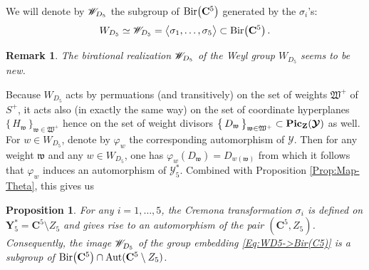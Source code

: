 \documentclass[11pt]{amsart}
\newtheorem{prop}[thm]{Proposition}
\newtheorem{rem}[thm]{Remark}
\begin{document}


We will denote by $\boldsymbol{\mathscr W}_{\hspace{-0.1cm}D_5}$ the subgroup of 
$ {\rm Bir}\big(  \mathbf C^5\big) $  generated by  the $\sigma_i$'s: 
\begin{equation}
\label{Eq:Bir-W-D5}
W_{D_5}\simeq \boldsymbol{\mathscr W}_{\hspace{-0.1cm}D_5}=\big\langle 
\sigma_1,\ldots,\sigma_5
\big\rangle  \subset {\rm Bir}\big(  \mathbf C^5\big) \, . 
\end{equation}%

\begin{rem}
The birational realization 
$\boldsymbol{\mathscr W}_{\hspace{-0.1cm}D_5}$
of the Weyl group $W_{D_5}$  seems to be new.
\end{rem}

Because $W_{D_5}$ acts by permuations (and transitively) on the set of weights $\mathfrak W^+$ of $S^+$, it acts also (in exactly the same way) on the set of coordinate hyperplanes $\big\{
\, H_{\mathfrak w}\, \big\}_{\mathfrak w \in \mathfrak W^+} $ hence on the set of weight divisors 
$\big\{
\, D_{\mathfrak w}\, \big\}_{\mathfrak w \in \mathfrak W^+} \subset {\bf Pic}_{\mathbf Z}(\boldsymbol{\mathcal Y})$ as well.  For $w\in W_{D_5}$, denote by $\varphi_w$ the corresponding automorphism of $\boldsymbol{\mathcal Y}$. Then for any weight $\mathfrak w$ and any $w\in W_{D_5}$, one has $\varphi_w(D_{\mathfrak w})= D_{w(\mathfrak w)}$ from which it follows that $\varphi_w$ induces an automorphism of $\boldsymbol{\mathcal Y}_5^*$. 
 Combined with Proposition \ref{Prop:Map-Theta}, this gives us 
\begin{prop}
\label{Prop:WD5->BIRC5}
For any $i=1,\ldots,5$, the Cremona transformation $\sigma_i$ is defined on $\boldsymbol{Y}_5^* =\mathbf C^5\setminus Z_5$ and gives rise to an automorphism of the pair $(\mathbf C^5,Z_5)$. Consequently, the image $\boldsymbol{\mathscr W}_{\hspace{-0.1cm}D_5}$ of the group embedding \eqref{Eq:WD5->Bir(C5)} is a subgroup of 
${\rm Bir}\big(  \mathbf C^5\big)\cap {\rm Aut}(\mathbf C^5\setminus Z_5)$. 
\end{prop}
\end{document}
